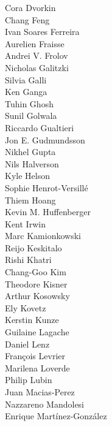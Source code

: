\documentclass[PICOAPC.tex]{subfiles}
\begin{document}
{\begin{multicols}{4}
Cora Dvorkin                    \\
Chang Feng                      \\
Ivan Soares Ferreira            \\
Aurelien Fraisse                \\
Andrei V. Frolov                \\
Nicholas Galitzki               \\
Silvia Galli                    \\
Ken Ganga                       \\
Tuhin Ghosh                     \\
Sunil Golwala                   \\
Riccardo Gualtieri              \\
Jon E. Gudmundsson              \\
Nikhel Gupta                    \\
Nils Halverson                  \\
Kyle Helson                     \\
Sophie Henrot-Versill\'e        \\
Thiem Hoang                     \\
Kevin M. Huffenberger           \\
Kent Irwin                      \\
Marc Kamionkowski               \\
Reijo Keskitalo                 \\
Rishi Khatri                    \\
Chang-Goo Kim                   \\
Theodore Kisner                 \\
Arthur Kosowsky                 \\
Ely Kovetz                      \\
Kerstin Kunze                   \\
Guilaine Lagache                \\
Daniel Lenz                     \\
Fran\c{c}ois Levrier            \\
Marilena Loverde                \\
Philip Lubin                    \\
Juan Macias-Perez               \\
Nazzareno Mandolesi             \\
Enrique Mart\'{i}nez-Gonz\'{a}lez   \\

\end{multicols}}
\end{document}
